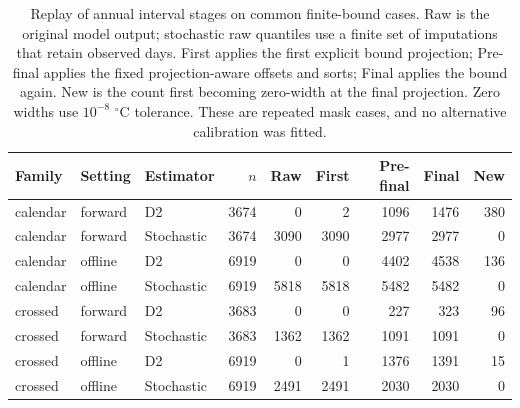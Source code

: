 \begin{table}[p]\centering\scriptsize
\caption{Replay of annual interval stages on common finite-bound cases. Raw is the original model output; stochastic raw quantiles use a finite set of imputations that retain observed days. First applies the first explicit bound projection; Pre-final applies the fixed projection-aware offsets and sorts; Final applies the bound again. New is the count first becoming zero-width at the final projection. Zero widths use $10^{-8}$ $^{\circ}$C tolerance. These are repeated mask cases, and no alternative calibration was fitted.}\label{tab:projection-stage-replay}
\begin{tabular}{lllrrrrrr}\toprule
Family & Setting & Estimator & $n$ & Raw & First & Pre-final & Final & New\\\midrule
calendar & forward & D2 & 3674 & 0 & 2 & 1096 & 1476 & 380\\
calendar & forward & Stochastic & 3674 & 3090 & 3090 & 2977 & 2977 & 0\\
calendar & offline & D2 & 6919 & 0 & 0 & 4402 & 4538 & 136\\
calendar & offline & Stochastic & 6919 & 5818 & 5818 & 5482 & 5482 & 0\\
crossed & forward & D2 & 3683 & 0 & 0 & 227 & 323 & 96\\
crossed & forward & Stochastic & 3683 & 1362 & 1362 & 1091 & 1091 & 0\\
crossed & offline & D2 & 6919 & 0 & 1 & 1376 & 1391 & 15\\
crossed & offline & Stochastic & 6919 & 2491 & 2491 & 2030 & 2030 & 0\\
\bottomrule\end{tabular}
\end{table}
